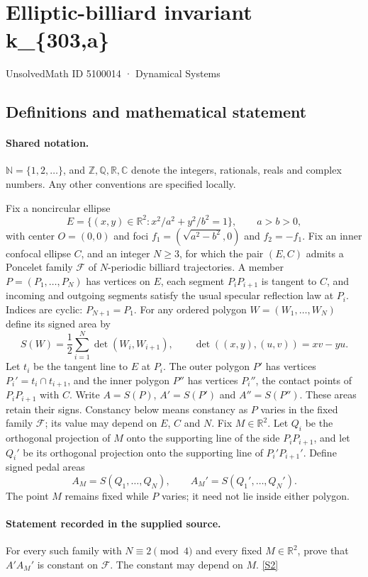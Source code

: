 \documentclass[11pt]{article}
\newcommand{\sref}[2]{\hyperlink{source:#1:#2}{[S#2]}}
\begin{document}
\setcounter{section}{5100013}
\section{Elliptic-billiard invariant k\_\{303,a\}}\label{5100014}
{\small\sffamily UnsolvedMath ID 5100014 · Dynamical Systems}
\subsection{Definitions and mathematical statement}

\paragraph{Shared notation.}$\mathbb N=\{1,2,\ldots\}$, and $\mathbb Z,\mathbb Q,\mathbb R,\mathbb C$ denote the integers, rationals, reals and complex numbers. Any other conventions are specified locally.


Fix a noncircular ellipse
\[
E=\{(x,y)\in\mathbb R^2:x^2/a^2+y^2/b^2=1\},\qquad a>b>0,
\]
with center $O=(0,0)$ and foci $f_1=(\sqrt{a^2-b^2},0)$ and $f_2=-f_1$. Fix an inner confocal ellipse $C$, and an integer $N\geq3$, for which the pair $(E,C)$ admits a Poncelet family $\mathcal F$ of $N$-periodic billiard trajectories. A member $P=(P_1,\ldots,P_N)$ has vertices on $E$, each segment $P_iP_{i+1}$ is tangent to $C$, and incoming and outgoing segments satisfy the usual specular reflection law at $P_i$. Indices are cyclic: $P_{N+1}=P_1$.
For any ordered polygon $W=(W_1,\ldots,W_N)$ define its signed area by
\[
S(W)=\frac12\sum_{i=1}^N\det(W_i,W_{i+1}),\qquad
\det((x,y),(u,v))=xv-yu.
\]
Let $t_i$ be the tangent line to $E$ at $P_i$. The outer polygon $P'$ has vertices $P_i'=t_i\cap t_{i+1}$, and the inner polygon $P''$ has vertices $P_i''$, the contact points of $P_iP_{i+1}$ with $C$. Write $A=S(P)$, $A'=S(P')$ and $A''=S(P'')$. These areas retain their signs. Constancy below means constancy as $P$ varies in the fixed family $\mathcal F$; its value may depend on $E$, $C$ and $N$.
Fix $M\in\mathbb R^2$. Let $Q_i$ be the orthogonal projection of $M$ onto the supporting line of the side $P_iP_{i+1}$, and let $Q_i'$ be its orthogonal projection onto the supporting line of $P_i'P_{i+1}'$. Define signed pedal areas
\[
A_M=S(Q_1,\ldots,Q_N),\qquad A_M'=S(Q_1',\ldots,Q_N').
\]
The point $M$ remains fixed while $P$ varies; it need not lie inside either polygon.
\paragraph{Statement recorded in the supplied source.}
For every such family with $N\equiv2\pmod4$ and every fixed $M\in\mathbb R^2$, prove that $A' A_M'$ is constant on $\mathcal F$. The constant may depend on $M$. \sref{5100014}{2}
\end{document}
